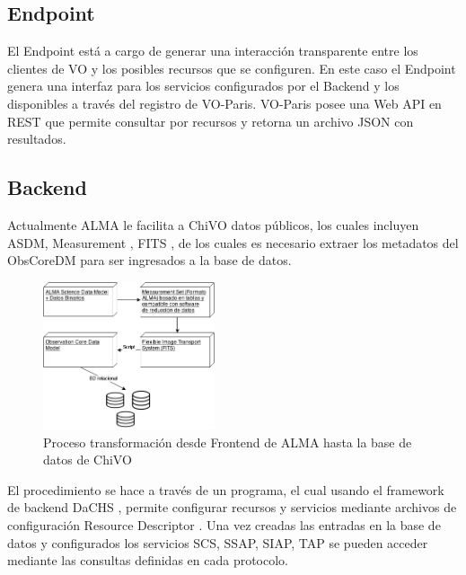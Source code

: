 \subsection{Endpoint}

El Endpoint está a cargo de generar una interacción transparente entre los clientes
de VO y los posibles recursos que se configuren.
En este caso el Endpoint genera una interfaz para los servicios configurados por el
Backend y los disponibles a través del registro de VO-Paris.
VO-Paris posee una Web API en REST que permite consultar por recursos y retorna un
archivo JSON con resultados.

\subsection{Backend}

Actualmente ALMA le facilita a ChiVO datos públicos, los cuales incluyen ASDM,
Measurement \cite{petry2012analysing}, FITS \cite{wells1981fits}, de los cuales es
necesario extraer los metadatos del ObsCoreDM para ser ingresados a la base de datos.

\begin{figure}[h!t]
    \centering
    \includegraphics[width=0.45\textwidth]{images/metadata.png}
    \caption{Proceso transformación desde Frontend de ALMA hasta la base de datos
             de ChiVO}
    \label{fig:metadata}
\end{figure}

El procedimiento se hace a través de un programa, el cual usando el framework de
backend DaCHS \cite{dachs}, permite configurar recursos y servicios mediante
archivos de configuración Resource Descriptor \cite{dachsorguide}.
Una vez creadas las entradas en la base de datos y configurados los servicios SCS,
SSAP, SIAP, TAP se pueden acceder mediante las consultas definidas en cada
protocolo.
